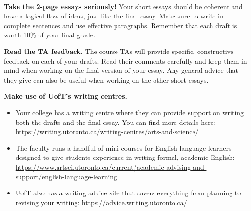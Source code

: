 \documentclass[12pt]{article}
\def\mydot{\textcolor{deepblue}{\rule{1ex}{1ex}}}
\newlength\sidebarwidth
\newcommand{\topic}[3][]%
	 {\pagebreak[2]%
	 \vspace{.2cm}
	 \begin{minipage}{\textwidth}
         \phantomsection\addcontentsline{toc}{section}{#1}%
         \nopagebreak\hspace{0in}%
         \nopagebreak\begin{minipage}[t]{\sidebarwidth - .2cm}
         \raggedleft \bf\sc 
	 \color{myblue}{\large #2}
	 \end{minipage}%
	 \hfill
	 \begin{minipage}[t]{\linewidth - \sidebarwidth}
	 \nopagebreak{\color{myblue}%
		    \rule{0pt}{\baselineskip}%
		    \rule{\linewidth}{2.5pt}%
		    \llap{\raisebox{.3\baselineskip}{\sf #1}}%
		    \vspace*{.1\baselineskip}%
		    }%
	 #3%
	 \end{minipage}
	 \end{minipage}}
\newenvironment{mywidth}{\begin{adjustwidth}{\sidebarwidth}{}}{\end{adjustwidth}}
\begin{document}
	\topic{Advice}{~}
	\begin{mywidth}
		\textbf{Take the 2-page essays seriously!}
		Your short essays should be coherent and have a logical
		flow of ideas, just like the final essay. Make sure
		to write in complete sentences and use effective
		paragraphs. Remember that each draft is worth 10\% of
		your final grade.

		
		\textbf{Read the TA feedback.} 
		The course TAs will provide specific, constructive feedback on each of your drafts. Read their comments carefully and keep them in mind when working on the final version of your essay. Any general advice that they give can also be useful when working on the other short essays.
		
		\textbf{Make use of UofT’s writing centres.}
		\begin{itemize}[leftmargin=1cm, itemsep=0ex, parsep=.5ex, labelindent=-4ex, label={\mydot}]
			\item Your college has a writing centre where they can provide support on writing both the drafts and the final essay. You can find more details here: \\\url{https://writing.utoronto.ca/writing-centres/arts-and-science/}
			\item The faculty runs a handful of mini-courses for English language learners designed to give students experience in writing formal, academic English:
			\url{https://www.artsci.utoronto.ca/current/academic-advising-and-support/english-language-learning}
			\item UofT also has a writing advice site that covers everything from planning to revising your writing: \url{https://advice.writing.utoronto.ca/}
		\end{itemize}
	\end{mywidth}
\end{document}
